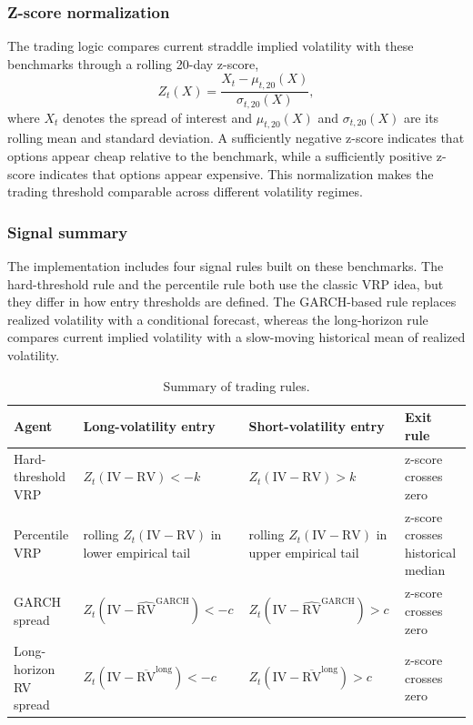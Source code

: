 ﻿\documentclass{article}
\begin{document}
\subsubsection{Z-score normalization}

The trading logic compares current straddle implied volatility with these benchmarks through a rolling 20-day z-score,
\[
Z_t(X)=\frac{X_t-\mu_{t,20}(X)}{\sigma_{t,20}(X)},
\]
where $X_t$ denotes the spread of interest and $\mu_{t,20}(X)$ and $\sigma_{t,20}(X)$ are its rolling mean and standard deviation. A sufficiently negative z-score indicates that options appear cheap relative to the benchmark, while a sufficiently positive z-score indicates that options appear expensive. This normalization makes the trading threshold comparable across different volatility regimes.

\subsubsection{Signal summary}

The implementation includes four signal rules built on these benchmarks. The hard-threshold rule and the percentile rule both use the classic VRP idea, but they differ in how entry thresholds are defined. The GARCH-based rule replaces realized volatility with a conditional forecast, whereas the long-horizon rule compares current implied volatility with a slow-moving historical mean of realized volatility.

\begin{table}[H]
\centering
\small
\caption{Summary of trading rules.}
\label{tab:signals}
\begin{tabularx}{\textwidth}{@{}>{\raggedright\arraybackslash}p{}Y Y >{\raggedright\arraybackslash}p{0.16\textwidth}@{}}
\toprule
Agent & Long-volatility entry & Short-volatility entry & Exit rule \\
\midrule
Hard-threshold VRP & $Z_t(\mathrm{IV}-\mathrm{RV})<-k$ & $Z_t(\mathrm{IV}-\mathrm{RV})>k$ & z-score crosses zero \\
Percentile VRP & rolling $Z_t(\mathrm{IV}-\mathrm{RV})$ in lower empirical tail & rolling $Z_t(\mathrm{IV}-\mathrm{RV})$ in upper empirical tail & z-score crosses historical median \\
GARCH spread & $Z_t(\mathrm{IV}-\widehat{\mathrm{RV}}^{\mathrm{GARCH}})<-c$ & $Z_t(\mathrm{IV}-\widehat{\mathrm{RV}}^{\mathrm{GARCH}})>c$ & z-score crosses zero \\
Long-horizon RV spread & $Z_t(\mathrm{IV}-\overline{\mathrm{RV}}^{\mathrm{long}})<-c$ & $Z_t(\mathrm{IV}-\overline{\mathrm{RV}}^{\mathrm{long}})>c$ & z-score crosses zero \\
\bottomrule
\end{tabularx}
\end{table}
\end{document}

